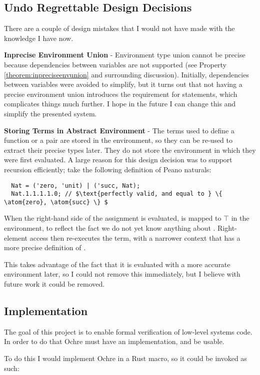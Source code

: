 \documentclass[12pt,twoside]{report}
\begin{document}
\subsection{Undo Regrettable Design Decisions}
There are a couple of design mistakes that I would not have made with the knowledge I have now.

\textbf{Inprecise Environment Union} - Environment type union cannot be precise because dependencies between variables are not supported (see Property \ref{theorem:inpreciseenvunion} and surrounding discussion). Initially, dependencies between variables were avoided to simplify, but it turns out that not having a precise environment union introduces the requirement for statements, which complicates things much further. I hope in the future I can change this and simplify the presented system.

\textbf{Storing Terms in Abstract Environment} - The terms used to define a function or a pair are stored in the environment, so they can be re-used to extract their precise types later. They do not store the environment in which they were first evaluated. A large reason for this design decision was to support recursion efficiently; take the following definition of Peano naturals:

\begin{verbatim}
  Nat = ('zero, 'unit) | ('succ, Nat);
  Nat.1.1.1.1.0; // $\text{perfectly valid, and equal to } \{ \atom{zero}, \atom{succ} \} $
\end{verbatim}

When the right-hand side of the assignment is evaluated,  is mapped to $\top$ in the environment, to reflect the fact we do not yet know anything about . Right-element access then re-executes the  term, with a narrower context that has a more precise definition of .

This takes advantage of the fact that it is evaluated with a more accurate environment later, so I could not remove this immediately, but I believe with future work it could be removed.

\subsection{Implementation}
The goal of this project is to enable formal verification of low-level systems code. In order to do that Ochre must have an implementation, and be usable.

To do this I would implement Ochre in a Rust macro, so it could be invoked as such:
\end{document}
